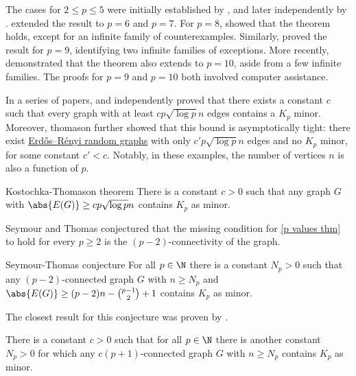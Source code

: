 \documentclass[a4paper, 12pt]{report}
\begin{document}
    The cases for $2 \le p \le 5$ were initially established by \textcite{dirac_p_2to5}, and later independently by \textcite{gyori}. \textcite{mader_p_6to7} extended the result to $p = 6$ and $p = 7$. For $p = 8$, \textcite{jorgensen} showed that the theorem holds, except for an infinite family of counterexamples. Similarly, \textcite{song} proved the result for $p = 9$, identifying two infinite families of exceptions. More recently, \textcite{zhu} demonstrated that the theorem also extends to $p = 10$, aside from a few infinite families. The proofs for $p = 9$ and $p = 10$ both involved computer assistance.

    In a series of papers, \textcite{kostochaka} and \textcite{thomason} independently proved that there exists a constant $c$ such that every graph with at least $cp\sqrt{\log p} n$ edges contains a $K_p$ minor. Moreover, thomason further showed that this bound is asymptotically tight: there exist \href{https://en.wikipedia.org/wiki/Erd%C5%91s%E2%80%93R%C3%A9nyi_model}{Erdős–Rényi random graphs} with only $c'p \sqrt{\log p} n$ edges and no $K_p$ minor, for some constant $c' < c$. Notably, in these examples, the number of vertices $n$ is also a function of $p$.

    \begin{framedthm}{Kostochka-Thomason theorem}
        There is a constant $c > 0$ such that any graph $G$ with $\abs{E(G)} \ge cp \sqrt{\log p}n$ contains $K_p$ as minor.
    \end{framedthm}

    Seymour and Thomas conjectured that the missing condition for \cref{p values thm} to hold for every $p \ge 2$ is the $(p - 2)$-connectivity of the graph.

    \begin{framedconj}{Seymour-Thomas conjecture}
        For all $p \in \N$ there is a constant $N_p > 0$ such that any $(p - 2)$-connected graph $G$ with $n \ge N_p$ and $\abs{E(G)} \ge (p - 2)n - \binom{p - 1}{2} + 1$ contains $K_p$ as minor.
    \end{framedconj}

    The closest result for this conjecture was proven by \textcite{bohme}.

    \begin{framedthm}{}
        There is a constant $c > 0$ such that for all $p \in \N$ there is another constant $N_p > 0$ for which any $c(p + 1)$-connected graph $G$ with $n \ge N_p$ contains $K_p$ as minor.
    \end{framedthm}
\end{document}
